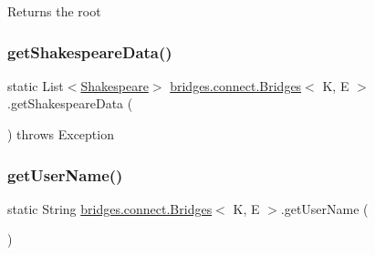 \begin{DoxyReturn}{Returns}
the root 
\end{DoxyReturn}
\hypertarget{classbridges_1_1connect_1_1_bridges_a03ba87a09742cfb40f357253239006e6}{}\label{classbridges_1_1connect_1_1_bridges_a03ba87a09742cfb40f357253239006e6} 
\subsubsection{\texorpdfstring{get\+Shakespeare\+Data()}{getShakespeareData()}}
{\footnotesize\ttfamily static List$<$\hyperlink{classbridges_1_1data__src__dependent_1_1_shakespeare}{Shakespeare}$>$ \hyperlink{classbridges_1_1connect_1_1_bridges}{bridges.\+connect.\+Bridges}$<$ K, E $>$.get\+Shakespeare\+Data (\begin{DoxyParamCaption}{ }\end{DoxyParamCaption}) throws Exception\hspace{0.3cm}{\ttfamily [static]}}

\hypertarget{classbridges_1_1connect_1_1_bridges_a5ff3fdd97d4c71c9c2141c3355e417aa}{}\label{classbridges_1_1connect_1_1_bridges_a5ff3fdd97d4c71c9c2141c3355e417aa} 
\subsubsection{\texorpdfstring{get\+User\+Name()}{getUserName()}}
{\footnotesize\ttfamily static String \hyperlink{classbridges_1_1connect_1_1_bridges}{bridges.\+connect.\+Bridges}$<$ K, E $>$.get\+User\+Name (\begin{DoxyParamCaption}{ }\end{DoxyParamCaption})\hspace{0.3cm}{\ttfamily [static]}}

\hypertarget{classbridges_1_1connect_1_1_bridges_a7193b48c9dc01b04dfcf0d66fa2f59fb}{}\label{classbridges_1_1connect_1_1_bridges_a7193b48c9dc01b04dfcf0d66fa2f59fb} 
